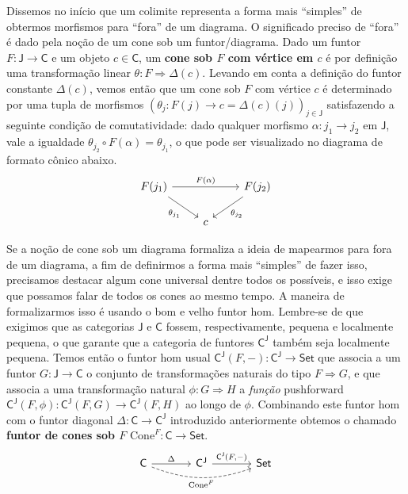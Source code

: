 Dissemos no início que um colimite representa a forma mais ``simples'' de obtermos morfismos para ``fora'' de um diagrama.
O significado preciso de ``fora'' é dado pela noção de um cone sob um funtor/diagrama.
Dado um funtor $F: \mathsf{J} \to \mathsf{C}$ e um objeto $c \in \mathsf{C}$, um \textbf{cone sob $F$ com vértice em $c$} é por definição uma transformação linear $\theta: F \Rightarrow \Delta(c)$.
Levando em conta a definição do funtor constante $\Delta(c)$, vemos então que um cone sob $F$ com vértice $c$ é determinado por uma tupla de morfismos $(\theta_j: F(j) \to c = \Delta(c)(j))_{j \in \mathsf{J}}$ satisfazendo a seguinte condição de comutatividade: dado qualquer morfismo $\alpha: j_1 \to j_2$ em $\mathsf{J}$, vale a igualdade $\theta_{j_2} \circ F(\alpha) = \theta_{j_1}$, o que pode ser visualizado no diagrama de formato cônico abaixo.
\begin{displaymath}
  \begin{tikzcd}
    F(j_1)
    \arrow[rr, "F(\alpha)"]
    \arrow[rd, "\theta_{j_1}" swap]
    & & F(j_2)
    \arrow[ld, "\theta_{j_2}"]
    \\ & c
  \end{tikzcd}
\end{displaymath}

Se a noção de cone sob um diagrama formaliza a ideia de mapearmos para fora de um diagrama, a fim de definirmos a forma mais ``simples'' de fazer isso, precisamos destacar algum cone universal dentre todos os possíveis, e isso exige que possamos falar de todos os cones ao mesmo tempo.
A maneira de formalizarmos isso é usando o bom e velho funtor hom.
Lembre-se de que exigimos que as categorias $\mathsf{J}$ e $\mathsf{C}$ fossem, respectivamente, pequena e localmente pequena, o que garante que a categoria de funtores $\mathsf{C^J}$ também seja localmente pequena.
Temos então o funtor hom usual $\mathsf{C^J}(F,-): \mathsf{C^J} \to \mathsf{Set}$ que associa a um funtor $G: \mathsf{J} \to \mathsf{C}$ o conjunto de transformações naturais do tipo $F \Rightarrow G$, e que associa a uma transformação natural $\phi: G \Rightarrow H$ a \emph{função} pushforward $\mathsf{C^J}(F,\phi): \mathsf{C^J}(F,G) \to \mathsf{C^J}(F,H)$ ao longo de $\phi$.
Combinando este funtor hom com o funtor diagonal $\Delta: \mathsf{C} \to \mathsf{C^J}$ introduzido anteriormente obtemos o chamado \textbf{funtor de cones sob $F$} $\mathrm{Cone}^F: \mathsf{C} \to \mathsf{Set}$.
\begin{displaymath}
  \begin{tikzcd}[column sep=1.25cm]
    \mathsf{C}
    \arrow[r, "\Delta"]
    \arrow[rr, dashed, bend right=20, "\mathrm{Cone}^F" swap]
    & \mathsf{C^J}
    \arrow[r, "{\mathsf{C^J}(F,-)}"]
    & \mathsf{Set}
  \end{tikzcd}
\end{displaymath}

